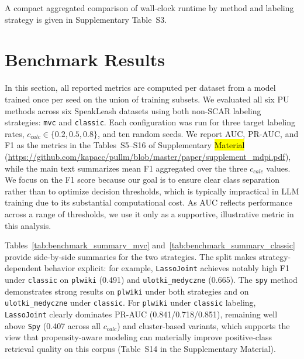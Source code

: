 \documentclass[applsci,article,accept,pdftex,moreauthors]{Definitions/mdpi}
\newcommand{\rev}[1]{{#1}}
\begin{document}
\rev{A compact aggregated comparison of wall-clock runtime by method and labeling strategy is given in Supplementary Table~S3.}

\section{Benchmark Results}
In this section, all reported metrics are computed per dataset from a model trained once per seed on the union of training subsets. We evaluated all six PU methods across six SpeakLeash datasets using both non-SCAR labeling strategies: \texttt{mvc} and \texttt{classic}. Each configuration was run for three target labeling rates, $c_{calc} \in \{0.2, 0.5, 0.8\}$, and ten random seeds. We report AUC, PR-AUC, and F1 as the metrics in the Tables~S5--S16 of Supplementary \hl{Material} %
 (\url{https://github.com/kapacc/pullm/blob/master/paper/supplement_mdpi.pdf}), while the main text summarizes mean F1 aggregated over the three $c_{calc}$ values. We focus on the F1 score because our goal is to ensure clear class separation rather than to optimize decision thresholds, which is typically impractical in LLM training due to its substantial computational cost. As AUC reflects performance across a range of thresholds, we use it only as a supportive, illustrative metric in this analysis.

Tables~\ref{tab:benchmark_summary_mvc} and~\ref{tab:benchmark_summary_classic} provide side-by-side summaries for the two strategies. The split makes strategy-dependent behavior explicit: for example, \texttt{LassoJoint} achieves notably high F1 under \texttt{classic} on \texttt{plwiki} (0.491) and \texttt{ulotki\_medyczne} (0.665). The \texttt{spy} method demonstrates strong results on \texttt{plwiki} under both strategies and on \texttt{ulotki\_medyczne} under \texttt{classic}. For \texttt{plwiki} under \texttt{classic} labeling, \texttt{LassoJoint} clearly dominates \mbox{PR-AUC} (0.841/0.718/0.851), remaining well above \texttt{Spy} (0.407 across all $c_{calc}$) and cluster-based variants, which supports the view that propensity-aware modeling can materially improve positive-class retrieval quality on this corpus (Table~S14 in the Supplementary Material).
\end{document}

